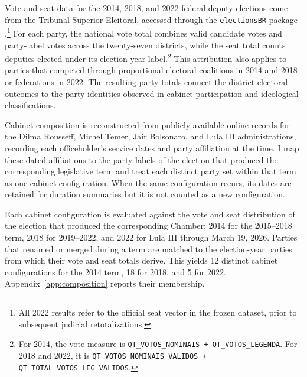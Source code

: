 \documentclass[11pt]{article}
\begin{document}
Vote and seat data for the 2014, 2018, and 2022 federal-deputy elections
come from the Tribunal Superior Eleitoral, accessed through the
\texttt{electionsBR} package \parencite{electionsbr}.\footnote{All 2022
results refer to the official seat vector in the frozen dataset, prior
to subsequent judicial retotalizations.} For each party, the national
vote total combines valid candidate votes and party-label votes across
the twenty-seven districts, while the seat total counts deputies elected
under its election-year label.\footnote{For 2014, the vote measure is
\texttt{QT\_VOTOS\_NOMINAIS + QT\_VOTOS\_LEGENDA}. For 2018 and 2022,
it is \texttt{QT\_VOTOS\_NOMINAIS\_VALIDOS +
QT\_TOTAL\_VOTOS\_LEG\_VALIDOS}.} This attribution also applies to
parties that competed through proportional electoral coalitions in
2014 and 2018 or federations in 2022. The resulting party totals connect
the district electoral outcomes to the party identities observed in
cabinet participation and ideological classifications.

Cabinet composition is reconstructed from publicly available online records for
the Dilma Rousseff, Michel Temer, Jair Bolsonaro, and Lula III administrations,
recording each officeholder's service dates and party affiliation at the time. I
map these dated affiliations to the party labels of the election that produced
the corresponding legislative term and treat each distinct party set within that
term as one cabinet configuration. When the same configuration recurs, its dates
are retained for duration summaries but it is not counted as a new
configuration.

Each cabinet configuration is evaluated against the vote and seat distribution
of the election that produced the corresponding Chamber: 2014 for the
2015--2018 term, 2018 for 2019--2022, and 2022 for Lula III through March
19, 2026. Parties that renamed or merged during a term are matched to the
election-year parties from which their vote and seat totals derive. This yields
12 distinct cabinet configurations for the 2014 term, 18 for 2018, and 5 for
2022. Appendix~\ref{app:composition} reports their membership.

\end{document}
